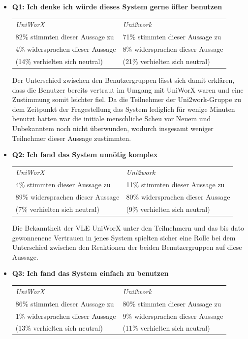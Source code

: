 \documentclass[11pt,a4paper,twoside,ngerman]{article}
\begin{document}
\begin{itemize}
    \item \textbf{Q1: Ich denke ich würde dieses System gerne öfter benutzen}
    
    \smallskip
    \begin{tabular}{p{6.5cm}|p{6.5cm}}
        \textit{UniWorX} & \textit{Uni2work} \\
        82\% stimmten dieser Aussage zu & 71\% stimmten dieser Aussage zu \\
        4\% widersprachen dieser Aussage & 8\% widersprachen dieser Aussage \\
        (14\% verhielten sich neutral) &  (21\% verhielten sich neutral)
    \end{tabular}
    
    \smallskip
    Der Unterschied zwischen den Benutzergruppen lässt sich damit erklären, dass die Benutzer bereits vertraut im Umgang mit UniWorX waren und eine Zustimmung somit leichter fiel. Da die Teilnehmer der Uni2work-Gruppe zu dem Zeitpunkt der Fragestellung das System lediglich für wenige Minuten benutzt hatten war die initiale menschliche Scheu vor Neuem und Unbekanntem noch nicht überwunden, wodurch insgesamt weniger Teilnehmer dieser Aussage zustimmten.
    \item \textbf{Q2: Ich fand das System unnötig komplex}
    
    \smallskip
    \begin{tabular}{p{6.5cm}|p{6.5cm}}
        \textit{UniWorX} & \textit{Uni2work} \\
        4\% stimmten dieser Aussage zu & 11\% stimmten dieser Aussage zu \\
        89\% widersprachen dieser Aussage & 80\% widersprachen dieser Aussage \\
        (7\% verhielten sich neutral) &  (9\% verhielten sich neutral)
    \end{tabular}
    
    \smallskip
    Die Bekanntheit der VLE UniWorX unter den Teilnehmern und das bis dato gewonnenene Vertrauen in jenes System spielten sicher eine Rolle bei dem Unterschied zwischen den Reaktionen der beiden Benutzergruppen auf diese Aussage.
    \item \textbf{Q3: Ich fand das System einfach zu benutzen}
    
    \smallskip
    \begin{tabular}{p{6.5cm}|p{6.5cm}}
        \textit{UniWorX} & \textit{Uni2work} \\
        86\% stimmten dieser Aussage zu & 80\% stimmten dieser Aussage zu \\
        1\% widersprachen dieser Aussage & 9\% widersprachen dieser Aussage \\
        (13\% verhielten sich neutral) &  (11\% verhielten sich neutral)
    \end{tabular}
    

\end{itemize}
\end{document}
